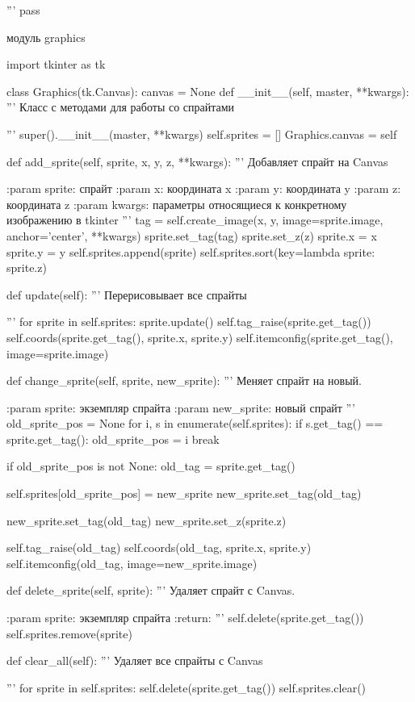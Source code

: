 '''
pass

модуль graphics

import tkinter as tk

class Graphics(tk.Canvas):
canvas = None
def \_\_init\_\_(self, master, **kwargs):
'''
Класс с методами для работы со спрайтами

'''
super().\_\_init\_\_(master, **kwargs)
self.sprites = []
Graphics.canvas = self

def add\_sprite(self, sprite, x, y, z, **kwargs):
'''
Добавляет спрайт на Canvas

:param sprite: спрайт
:param x: координата x
:param y: координата y
:param z: координата z
:param kwargs: параметры относящиеся к конкретному изображению в tkinter
'''
tag = self.create\_image(x, y, image=sprite.image, anchor='center', **kwargs)
sprite.set\_tag(tag)
sprite.set\_z(z)
sprite.x = x
sprite.y = y
self.sprites.append(sprite)
self.sprites.sort(key=lambda sprite: sprite.z)

def update(self):
'''
Перерисовывает все спрайты

'''
for sprite in self.sprites:
sprite.update()
self.tag\_raise(sprite.get\_tag())
self.coords(sprite.get\_tag(), sprite.x, sprite.y)
self.itemconfig(sprite.get\_tag(), image=sprite.image)


def change\_sprite(self, sprite, new\_sprite):
'''
Меняет  спрайт на новый.

:param sprite: экземпляр спрайта
:param new\_sprite: новый спрайт
'''
old\_sprite\_pos = None
for i, s in enumerate(self.sprites):
if s.get\_tag() == sprite.get\_tag():
old\_sprite\_pos = i
break

if old\_sprite\_pos is not None:
old\_tag = sprite.get\_tag()

self.sprites[old\_sprite\_pos] = new\_sprite
new\_sprite.set\_tag(old\_tag)

new\_sprite.set\_tag(old\_tag)
new\_sprite.set\_z(sprite.z)

self.tag\_raise(old\_tag)
self.coords(old\_tag, sprite.x, sprite.y)
self.itemconfig(old\_tag, image=new\_sprite.image)

def delete\_sprite(self, sprite):
'''
Удаляет спрайт с Canvas.

:param sprite: экземпляр спрайта
:return:
'''
self.delete(sprite.get\_tag())
self.sprites.remove(sprite)

def clear\_all(self):
'''
Удаляет все спрайты с Canvas

'''
for sprite in self.sprites:
self.delete(sprite.get\_tag())
self.sprites.clear()

